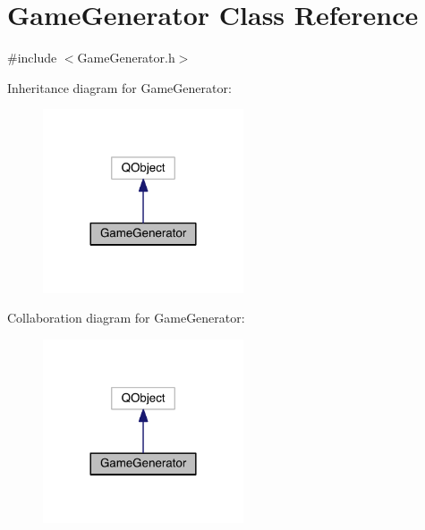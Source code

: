 \hypertarget{class_game_generator}{\section{Game\+Generator Class Reference}
\label{class_game_generator}
}


{\ttfamily \#include $<$Game\+Generator.\+h$>$}



Inheritance diagram for Game\+Generator\+:\nopagebreak
\begin{figure}[H]
\begin{center}
\leavevmode
\includegraphics[width=168pt]{class_game_generator__inherit__graph}
\end{center}
\end{figure}


Collaboration diagram for Game\+Generator\+:\nopagebreak
\begin{figure}[H]
\begin{center}
\leavevmode
\includegraphics[width=168pt]{class_game_generator__coll__graph}
\end{center}
\end{figure}
